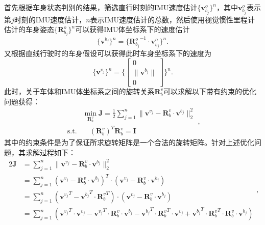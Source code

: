 首先根据车身状态判别的结果，筛选直行时刻的IMU速度估计$\{\symbf{v}^o_{b_{j}}\}^n$，其中$\symbf{v}^o_{b_{j}}$表示第$j$时刻的IMU速度估计，$n$表示IMU速度估计的总数，然后使用视觉惯性里程计估计的车身姿态$\{ \symbf{R}_{b_{j}}^o\}^n$可以获得IMU体坐标系下的速度估计
\begin{equation}
  \{\symbf{v}^{b_{j}}\}^n = \{ {\symbf{R}_{b_{j}}^o}^{-1} \cdot \symbf{v}^o_{b_{j}} \}^n.
\end{equation}
又根据直线行驶时的车身假设可以获得此时车身坐标系下的速度为
\begin{equation}
  \{\symbf{v}^{v_{j}}\}^n = \{ \begin{bmatrix}
    0 \\
    \| \symbf{v}^{b_{j}} \| \\ 
    0
  \end{bmatrix}\}^n.
\end{equation}
此时，关于车体和IMU体坐标系之间的旋转关系$\symbf{R}_{b}^{v}$可以求解以下带有约束的优化问题获得：
\begin{equation}
\begin{aligned}
  &\min_{\symbf{R}_{b}^{v}} \symbf{J} = \frac{1}{2} \sum_{j=1}^{n} \| \symbf{v}^{v_{j}} - \symbf{R}_{b}^{v} \cdot \symbf{v}^{b_{j}} \|_2^2 \\
  \text{s.t.} & \quad {(\symbf{R}_{b}^{v})}^T \symbf{R}_{b}^{v} = \symbf{I}
\end{aligned},
\end{equation}
其中的约束条件是为了保证所求旋转矩阵是一个合法的旋转矩阵。针对上述优化问题，其求解过程如下：
\begin{equation}
\begin{aligned}
  2\symbf{J} &= \sum_{j=1}^{n} \| \symbf{v}^{v_{j}} - \symbf{R}_{b}^{v} \cdot \symbf{v}^{b_{j}} \|_2^2 \\ 
  &= \sum_{j=1}^{n} {(\symbf{v}^{v_{j}} - \symbf{R}_{b}^{v} \cdot \symbf{v}^{b_{j}})}^T \cdot {(\symbf{v}^{v_{j}} - \symbf{R}_{b}^{v} \cdot \symbf{v}^{b_{j}})} \\
  &= \sum_{j=1}^{n} {({\symbf{v}^{v_{j}}}^T - {\symbf{v}^{b_{j}}}^T \cdot {\symbf{R}_{b}^{v}}^T)} \cdot {(\symbf{v}^{v_{j}} - \symbf{R}_{b}^{v} \cdot \symbf{v}^{b_{j}})} \\
  &= \sum_{j=1}^{n} ({\symbf{v}^{v_{j}}}^T \cdot \symbf{v}^{v_{j}} - {\symbf{v}^{v_{j}}}^T \cdot \symbf{R}_{b}^{v} \cdot \symbf{v}^{b_{j}} - {\symbf{v}^{b_{j}}}^T \cdot {\symbf{R}_{b}^{v}}^T \cdot {\symbf{v}^{v_{j}}} + {\symbf{v}^{b_{j}}}^T \cdot {\symbf{R}_{b}^{v}}^T \cdot \symbf{R}_{b}^{v} \cdot \symbf{v}^{b_{j}})
\end{aligned},
\end{equation}
